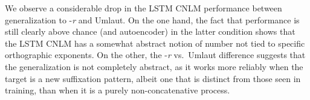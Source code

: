 We observe a considerable drop in the LSTM CNLM performance between
generalization to -\emph{r} and Umlaut. On the one hand, the fact that
performance is still clearly above chance (and autoencoder) in the
latter condition shows that the LSTM CNLM has a somewhat abstract
notion of number not tied to specific orthographic exponents. On the
other, the -\emph{r} vs.~Umlaut difference suggests that the
generalization is not completely abstract, as it works more reliably
when the target is a new suffixation pattern, albeit one that is
distinct from those seen in training, than when
it is a purely non-concatenative process.





